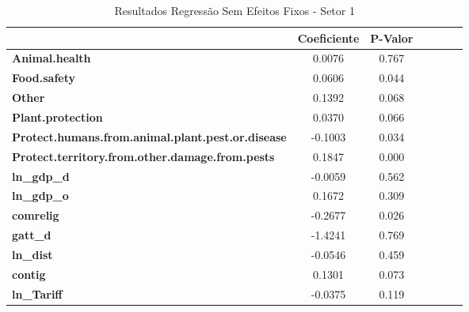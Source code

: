 \begin{table}[ht]
    \begin{center}
    \begin{tabular}{lcccccc}
                                                              & \textbf{Coeficiente} &\textbf{P-Valor} \\
    \midrule
    \textbf{Animal.health}                                    &       0.0076  &        0.767        \\
    \textbf{Food.safety}                                      &       0.0606  &        0.044        \\
    \textbf{Other}                                            &       0.1392  &        0.068        \\
    \textbf{Plant.protection}                                 &       0.0370  &        0.066        \\
    \textbf{Protect.humans.from.animal.plant.pest.or.disease} &      -0.1003  &        0.034        \\
    \textbf{Protect.territory.from.other.damage.from.pests}   &       0.1847  &        0.000        \\
    \textbf{ln\_gdp\_d}                                       &      -0.0059  &        0.562        \\
    \textbf{ln\_gdp\_o}                                       &       0.1672  &        0.309        \\
    \textbf{comrelig}                                         &      -0.2677  &        0.026        \\
    \textbf{gatt\_d}                                          &      -1.4241  &        0.769        \\
    \textbf{ln\_dist}                                         &      -0.0546  &        0.459        \\
    \textbf{contig}                                           &       0.1301  &        0.073        \\
    \textbf{ln\_Tariff}                                       &      -0.0375  &        0.119        \\
    \bottomrule
    \end{tabular}
    \caption{Resultados Regressão Sem Efeitos Fixos - Setor 1}
    \end{center}
    \end{table}